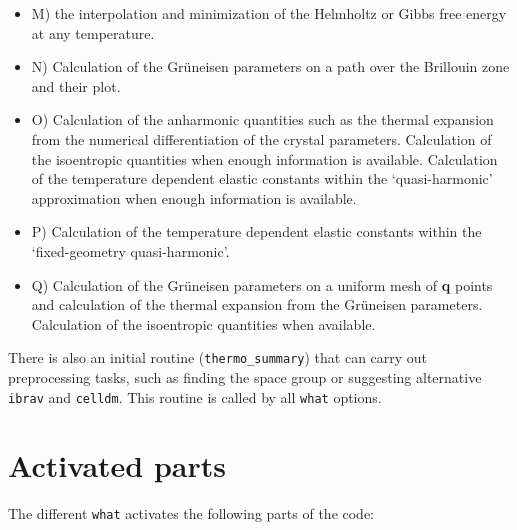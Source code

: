\documentclass[12pt,a4paper]{article}
\begin{document}
\begin{itemize}

\item
M) the interpolation and minimization of the 
Helmholtz or Gibbs free energy at any temperature.

\item
N) Calculation of the Gr\"uneisen parameters on a path over the Brillouin
zone and their plot.

\item
O) Calculation of the anharmonic quantities such as the thermal expansion
from the numerical differentiation of the crystal parameters. Calculation
of the isoentropic quantities when enough information is available. 
Calculation of the temperature dependent elastic constants within 
the `quasi-harmonic' approximation when enough information is available.

\item
P) Calculation of the temperature dependent elastic constants within the
`fixed-geometry quasi-harmonic'.

\item
Q) Calculation of the Gr\"uneisen parameters on a uniform mesh of {\bf q} 
points and calculation of the thermal expansion from the Gr\"uneisen parameters.
Calculation of the isoentropic quantities when available.

\end{itemize}
There is also an initial routine (\texttt{thermo\_summary}) that can carry
out preprocessing tasks, such as finding the space group or suggesting
alternative \texttt{ibrav} and \texttt{celldm}. This routine is called by
all \texttt{what} options.

\newpage
\section{\color{coral}Activated parts}

The different \texttt{what} activates the following parts of the code:
\end{document}
